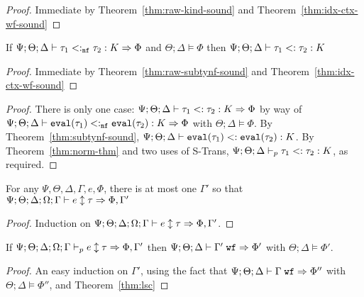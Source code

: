 \kindsound*
\begin{proof}
Immediate by Theorem~\ref{thm:raw-kind-sound} and Theorem~\ref{thm:idx-ctx-wf-sound}
\end{proof}

\begin{theorem}
If $\Psi ; \Theta ; \Delta \vdash \tau_1 <:_{\texttt{nf}} \tau_2 : K \Rightarrow \Phi$ and $\Theta ; \Delta \vDash \Phi$ then $\Psi ; \Theta ; \Delta \vdash \tau_1 <: \tau_2 : K$\label{thm:raw-subtynf-sound}
\end{theorem}

\subtynfsound*
\begin{proof}
Immediate by Theorem~\ref{thm:raw-subtynf-sound} and Theorem~\ref{thm:idx-ctx-wf-sound}
\end{proof}

\subtysound*
\begin{proof}
There is only one case: $\Psi ; \Theta ; \Delta \vdash \tau_1 <:\tau_2 : K \Rightarrow \Phi$ by way of $\Psi ; \Theta ; \Delta \vdash \texttt{eval}(\tau_1) <:_{\texttt{nf}} \texttt{eval}(\tau_2) : K \Rightarrow \Phi$ with $\Theta ; \Delta \vDash \Phi$. By Theorem~\ref{thm:subtynf-sound}, $\Psi ; \Theta ; \Delta \vdash \texttt{eval}(\tau_1) <: \texttt{eval}(\tau_2) : K$. By Theorem~\ref{thm:norm-thm} and two uses of S-Trans, $\Psi ; \Theta ; \Delta \vdash_p \tau_1 <: \tau_2 : K$, as required.
\end{proof}

\begin{theorem}
For any $\Psi,\Theta,\Delta,\Gamma,e,\Phi$, there is at most one $\Gamma'$ so that $\Psi ; \Theta ; \Delta ; \Omega ; \Gamma \vdash e \updownarrow \tau \Rightarrow \Phi, \Gamma'$
\label{thm:ctx-uniquely-determined}
\end{theorem}

\lsc*
\begin{proof}
Induction on $\Psi ; \Theta ; \Delta ; \Omega ; \Gamma \vdash e \updownarrow \tau \Rightarrow \Phi, \Gamma'$.
\end{proof}

\begin{theorem}
If $\Psi ; \Theta ; \Delta ; \Omega ; \Gamma \vdash_p e \updownarrow \tau \Rightarrow \Phi,\Gamma'$ then $\Psi ; \Theta ; \Delta \vdash \Gamma' \; \texttt{wf} \Rightarrow \Phi'$ with $\Theta ; \Delta \vDash \Phi'$.
\end{theorem}
\begin{proof}
An easy induction on $\Gamma'$, using the fact that $\Psi ; \Theta ; \Delta \vdash \Gamma \; \texttt{wf} \Rightarrow \Phi''$ with $\Theta ; \Delta \vDash \Phi''$, and Theorem~\ref{thm:lsc}
\end{proof}

